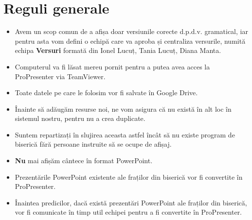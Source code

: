 \documentclass[epjST]{svjour}
\begin{document}
  \section{Reguli generale}
  \label{sec:2}
  \begin{itemize}
    \item Avem un scop comun de a afișa doar versiunile corecte d.p.d.v.
      gramatical, iar pentru asta vom defini o echipă care va aproba și centraliza
      versurile, numită echipa \textbf{Versuri} formată din Ionel Lucuț, Tania
      Lucuț, Diana Manta.

    \item Computerul va fi lăsat mereu pornit pentru a putea avea acces la ProPresenter
      via TeamViewer.

    \item Toate datele pe care le folosim vor fi salvate în Google Drive.

    \item Înainte să adăugăm resurse noi, ne vom asigura că nu există în alt loc
      în sistemul nostru, pentru nu a crea duplicate.

    \item Suntem repartizați în slujirea aceasta astfel încât să nu existe program
      de biserică fără persoane instruite să se ocupe de afișaj.

    \item \textbf{Nu} mai afișăm cântece în format PowerPoint.

    \item Prezentările PowerPoint existente ale fraților din biserică vor fi convertite
      în ProPresenter.

    \item Înaintea predicilor, dacă există prezentări PowerPoint ale fraților
      din biserică, vor fi comunicate în timp util echipei pentru a fi convertite
      în ProPresenter.
  \end{itemize}
\end{document}
